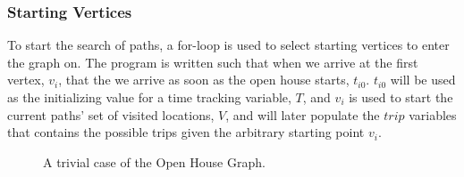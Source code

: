 \documentclass[letterpaper,11pt]{report}
\theoremstyle{definition}
\theoremstyle{definition}
\begin{document}
\subsubsection{Starting Vertices}
To start the search of paths, a for-loop is used to select starting vertices to enter the graph on. The program is written such that when we arrive at the first vertex, $v_i$, that the we arrive as soon as the open house starts, $t_{i0}$. $t_{i0}$ will be used as the initializing value for a time tracking variable, $T$, and $v_i$ is used to start the current paths' set of visited locations, $V$, and will later populate the $trip$ variables that contains the possible trips given the arbitrary starting point $v_i$.
\begin{figure}[!htb]
  \begin{center}
      
      \caption{A trivial case of the Open House Graph.}\label{trivial-graph}
    \end{center}
\end{figure}
\end{document}
